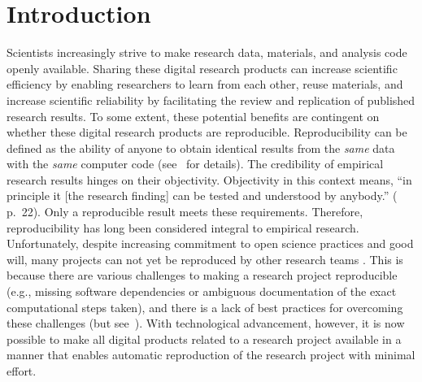 \documentclass[psych,tutorial,accept,moreauthors,pdftex]{Definitions/mdpi}
\begin{document}


\section{Introduction}\label{introduction}

Scientists increasingly strive to make research data, materials, and
analysis code openly available. Sharing these digital research products
can increase scientific efficiency by enabling researchers to learn from
each other, reuse materials, and increase scientific reliability by
facilitating the review and replication of published research results.
To some extent, these potential benefits are contingent on whether these
digital research products are reproducible. Reproducibility can be
defined as the ability of anyone to obtain identical results from the
\emph{same} data with the {\emph{same}}
 computer code (see~\citep{Peikert2019} {for
details).}
 The credibility of empirical research results
hinges on their objectivity. Objectivity in this context means, ``in
principle it {[}the research finding{]} can be tested and understood by
anybody.'' (\citep{popperLogicScientificDiscovery2002} p.~22). Only a
reproducible result meets these requirements. Therefore, reproducibility
has long been considered integral to empirical research. Unfortunately,
despite increasing commitment to open science practices and good will,
many projects can not yet be reproduced by other research teams
\citep{obels2020}. This is because there are various challenges to
making a research project reproducible (e.g., missing software
dependencies or ambiguous documentation of the exact computational steps
taken), and there is a lack of best practices for overcoming these
challenges (but see~\citep{vanlissa2020worcs}). With technological
advancement, however, it is now possible to make all digital products
related to a research project available in a manner that enables
automatic reproduction of the research project with minimal effort.
\end{document}
